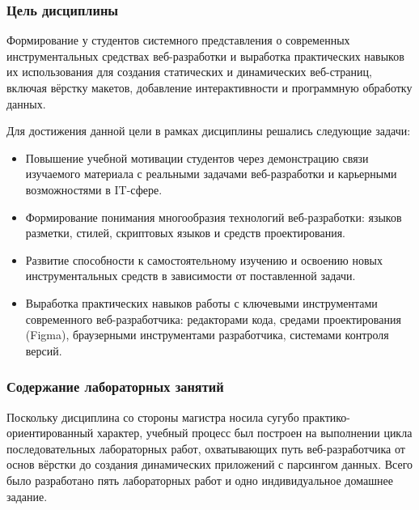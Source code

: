 \subsubsection{Цель дисциплины}

Формирование у студентов системного представления о современных инструментальных средствах веб-разработки и выработка практических навыков их использования для создания статических и динамических веб-страниц, включая вёрстку макетов, добавление интерактивности и программную обработку данных.

Для достижения данной цели в рамках дисциплины решались следующие задачи:
\begin{itemize}
    \item Повышение учебной мотивации студентов через демонстрацию связи изучаемого материала с реальными задачами веб-разработки и карьерными возможностями в IT-сфере.
    \item Формирование понимания многообразия технологий веб-разработки: языков разметки, стилей, скриптовых языков и средств проектирования.
    \item Развитие способности к самостоятельному изучению и освоению новых инструментальных средств в зависимости от поставленной задачи.
    \item Выработка практических навыков работы с ключевыми инструментами современного веб-разработчика: редакторами кода, средами проектирования (Figma), браузерными инструментами разработчика, системами контроля версий.
\end{itemize}

\subsubsection{Содержание лабораторных занятий}

Поскольку дисциплина со стороны магистра носила сугубо практико-ориентированный характер, учебный процесс был построен на выполнении цикла последовательных лабораторных работ, охватывающих путь веб-разработчика от основ вёрстки до создания динамических приложений с парсингом данных. Всего было разработано пять лабораторных работ и одно индивидуальное домашнее задание.

